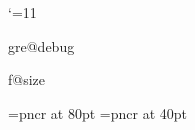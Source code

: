 %
%
%
%
%


\edef\greoldcatcode{\the\catcode`@}
\catcode`\@=11





\def\greerror#1{\errmessage{GregorioTeX error: #1}}%
\def\gre@warning#1{\message{GregorioTeX warning: #1}}%
\def\gre@bug#1{\errmessage{GregorioTeX bug: #1 !! This is a bug in Gregorio.  Please report it at https://github.com/gregorio-project/gregorio/issues}}%


\ifx\csname gre@debug\endcsname\relax%
\else%
  \def\gre@debug{}%
\fi%

\ifx\csname f@size\endcsname\relax%
\else%
  \def\f@size{\directlua{gregoriotex.font_size()}}%
\fi%



\def\greinitialformat#1{%
  {\gre@fontofinitial #1}%
  \relax %
}%

\def\grebiginitialformat#1{%
  {\gre@fontofbiginitial #1}%
  \relax %
}


\font\gre@fontofbiginitial=pncr at 80pt%
\font\gre@fontofinitial=pncr at 40pt%

\def\gre@format@initial{%
  \begingroup%
  \gre@fontofinitial%
  \relax %
}%
\def\endgre@format@initial{\endgroup}%

\def\gre@format@biginitial{%
  \begingroup%
  \gre@fontofbiginitial%
  \relax %
}%
\def\endgre@format@biginitial{\endgroup}%


